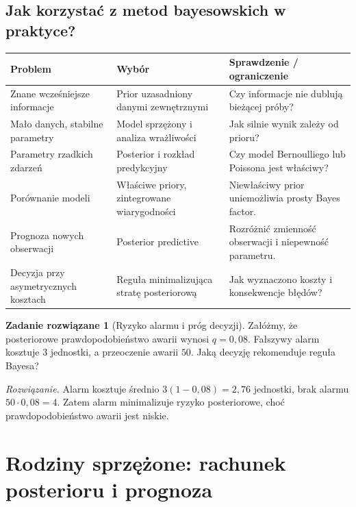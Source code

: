 \documentclass[11pt,a4paper,oneside]{report}
\numberwithin{equation}{chapter}
\theoremstyle{plain}
\theoremstyle{definition}
\newtheorem{zadanie}{Zadanie rozwiązane}[chapter]
\theoremstyle{remark}
\begin{document}
\section{Jak korzystać z metod bayesowskich w praktyce?}
\begin{center}\small
\begin{tabular}{>{\raggedright\arraybackslash}p{}>{\raggedright\arraybackslash}p{}>{\raggedright\arraybackslash}p{}}
\toprule
\textbf{Problem} & \textbf{Wybór} & \textbf{Sprawdzenie / ograniczenie}\\
\midrule
Znane wcześniejsze informacje & Prior uzasadniony danymi zewnętrznymi & Czy informacje nie dublują bieżącej próby?\\
Mało danych, stabilne parametry & Model sprzężony i analiza wrażliwości & Jak silnie wynik zależy od prioru?\\
Parametry rzadkich zdarzeń & Posterior i rozkład predykcyjny & Czy model Bernoulliego lub Poissona jest właściwy?\\
Porównanie modeli & Właściwe priory, zintegrowane wiarygodności & Niewłaściwy prior uniemożliwia prosty Bayes factor.\\
Prognoza nowych obserwacji & Posterior predictive & Rozróżnić zmienność obserwacji i niepewność parametru.\\
Decyzja przy asymetrycznych kosztach & Reguła minimalizująca stratę posteriorową & Jak wyznaczono koszty i konsekwencje błędów?\\
\bottomrule
\end{tabular}
\end{center}

\begin{zadanie}[Ryzyko alarmu i próg decyzji]
Załóżmy, że posteriorowe prawdopodobieństwo awarii wynosi $q=0{,}08$.
Fałszywy alarm kosztuje $3$ jednostki, a przeoczenie awarii $50$.
Jaką decyzję rekomenduje reguła Bayesa?
\par\emph{Rozwiązanie.} Alarm kosztuje średnio
$3(1-0{,}08)=2{,}76$ jednostki, brak alarmu
$50\cdot0{,}08=4$. Zatem alarm minimalizuje ryzyko
posteriorowe, choć prawdopodobieństwo awarii jest niskie.
\end{zadanie}

\chapter{Rodziny sprzężone: rachunek posterioru i prognoza}
\label{ch:conjugate-families}
\end{document}
